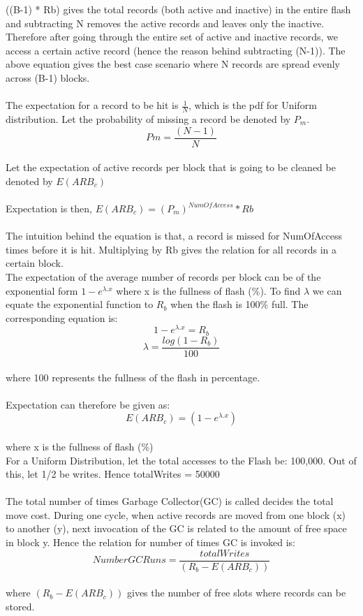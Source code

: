 ((B-1) * Rb) gives the total records (both active and inactive) in the entire flash and subtracting N removes the active records and leaves only the inactive. Therefore after going through the entire set of active and inactive records, we access a certain active record (hence the reason behind subtracting (N-1)). The above equation gives the best case scenario where N records are spread evenly across (B-1) blocks.\\
\\

The expectation for a record to be hit is $\frac{1}{N}$, which is the pdf for Uniform distribution. Let the probability of missing a record be denoted by $P_m$. 
\begin{equation}Pm = \frac{(N-1)}{N}\end{equation}\\
Let the expectation of active records per block that is going to be cleaned be denoted by $E(ARB_c)$\\
\\

Expectation is then, $E(ARB_c) = (P_m)^{NumOfAccess} * Rb$\\
\\
The intuition behind the equation is that, a record is missed for NumOfAccess times before it is hit. Multiplying by Rb gives the relation for all records in a certain block.\\


The expectation of the average number of records per block can be of the exponential form $1-e^{\lambda . x}$ where x is the fullness of flash (\%). To find $\lambda$ we can equate the exponential function to $R_b$ when the flash is 100\% full. 
The corresponding equation is:
$$1-e^{\lambda . x} = R_b$$
$$\lambda = \frac{log(1 - R_b)}{100}$$\\
where 100 represents the fullness of the flash in percentage.\\
\\
Expectation can therefore be given as: $$E(ARB_c) = (1 - e^{\lambda . x})$$\\
where x is the fullness of flash (\%)
\\

For a Uniform Distribution, let the total accesses to the Flash be: 100,000. Out of this, let 1/2 be writes. Hence totalWrites = 50000\\
\\

The total number of times  Garbage Collector(GC) is called decides the total move cost. During one cycle, when active records are moved from one block (x) to another (y), next invocation of the GC is related to the amount of free space in block y. Hence the relation for number of times GC is invoked is:\\
\begin{equation}NumberGCRuns = \frac{totalWrites}{(R_b - E(ARB_c))}\end{equation}\\
where ${(R_b - E(ARB_c))}$ gives the number of free slots where records can be stored.\\
\\

